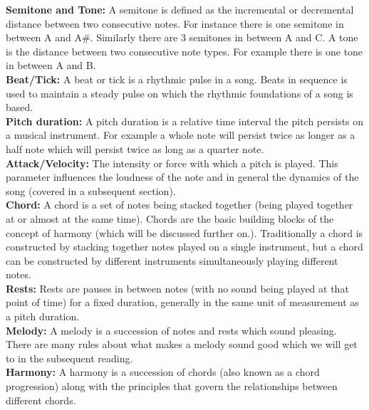 \noindent \textbf{Semitone and Tone:} A semitone is defined as the incremental or decremental distance between two consecutive notes. For instance there is one semitone in between A and A\#. Similarly there are 3 semitones in between A and C. A tone is the distance between two consecutive note types. For example there is one tone in between A and B. \\

\noindent \textbf{Beat/Tick:} A beat or tick is a rhythmic pulse in a song. Beats in sequence is used to maintain a steady pulse on which the rhythmic foundations of a song is based.  \\

\noindent \textbf{Pitch duration:} A pitch duration is a relative time interval the pitch persists on a musical instrument. For example a whole note will persist twice as longer as a half note which will persist twice as long as a quarter note.  \\

\noindent \textbf{Attack/Velocity:} The intensity or force with which a pitch is played. This parameter influences the loudness of the note and in general the dynamics of the song (covered in a subsequent section).  \\

\noindent \textbf{Chord:} A chord is a set of notes being stacked together (being played together at or almost at the same time). Chords are the basic building blocks of the concept of harmony (which will be discussed further on.). Traditionally a chord is constructed by stacking together notes played on a single instrument, but a chord can be constructed by different instruments simultaneously playing different notes. \\

\noindent \textbf{Rests:} Rests are pauses in between notes (with no sound being played at that point of time) for a fixed duration, generally in the same unit of measurement as a pitch duration. \\

\noindent \textbf{Melody:} A melody is a succession of notes and rests which sound pleasing. There are many rules about what makes a melody sound good which we will get to in the subsequent reading. \\

\noindent \textbf{Harmony:} A harmony is a succession of chords (also known as a chord progression) along with the principles that govern the relationships between different chords. \\

